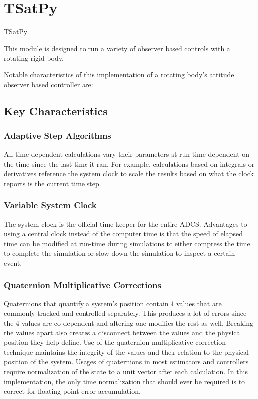 
\chapter{TSatPy}
\label{chap:TSatPy}

TSatPy

This module is designed to run a variety of observer based controls with a rotating rigid body.

Notable characteristics of this implementation of a rotating body's attitude observer based controller are:
\section{Key Characteristics}
\label{sec:KeyCharacteristics}

\subsection{Adaptive Step Algorithms}

All time dependent calculations vary their parameters at run-time dependent on the time since the last time it ran. For example, calculations based on integrals or derivatives reference the system clock to scale the results based on what the clock reports is the current time step.

\subsection{Variable System Clock}

The system clock is the official time keeper for the entire ADCS. Advantages to using a central clock instead of the computer time is that the speed of elapsed time can be modified at run-time during simulations to either compress the time to complete the simulation or slow down the simulation to inspect a certain event.

\subsection{Quaternion Multiplicative Corrections}

Quaternions that quantify a system's position contain 4 values that are commonly tracked and controlled separately. This produces a lot of errors since the 4 values are co-dependent and altering one modifies the rest as well. Breaking the values apart also creates a disconnect between the values and the physical position they help define. Use of the quaternion multiplicative correction technique maintains the integrity of the values and their relation to the physical position of the system. Usages of quaternions in most estimators and controllers require normalization of the state to a unit vector after each calculation. In this implementation, the only time normalization that should ever be required is to correct for floating point error accumulation.

